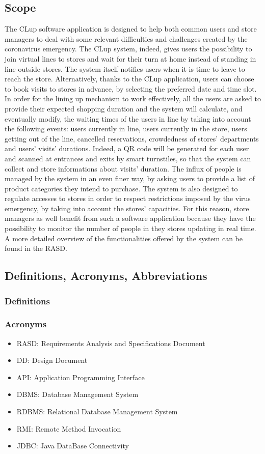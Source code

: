 \documentclass{article}
\begin{document}
\subsection{Scope}
The CLup software application is designed to help both common users and store managers to deal with some relevant difficulties and challenges created by the coronavirus emergency. The CLup system, indeed, gives users the possibility to join virtual lines to stores and wait for their turn at home instead of standing in line outside stores. The system itself notifies users when it is time to leave to reach the store. Alternatively, thanks to the CLup application, users can choose to book visits to stores in advance, by selecting the preferred date and time slot.
 In order for the lining up mechanism to work effectively, all the users are asked to provide their expected shopping duration and the system will calculate, and eventually modify, the waiting times of the users in line by taking into account the following events: users currently in line, users currently in the store, users getting out of the line, cancelled reservations, crowdedness of stores’ departments and users’ visits’ durations. Indeed, a QR code will be generated for each user and scanned at entrances and exits by smart turnstiles, so that the system can collect and store informations about visits’ duration. The influx of people is managed by the system in an even finer way, by asking users to provide a list of product categories they intend to purchase. The system is also designed to regulate accesses to stores in order to respect restrictions imposed by the virus emergency, by taking into account the stores’ capacities. For this reason, store managers as well benefit from such a software application because they have the possibility to monitor the number of people in they stores updating in real time.\\
A more detailed overview of the functionalities offered by the system can be found in the RASD.

\subsection{Definitions, Acronyms, Abbreviations}
\subsubsection{Definitions}
\subsubsection{Acronyms}
\begin{itemize}
\item RASD: Requirements Analysis and Specifications Document
\item DD: Design Document
\item API: Application Programming Interface
\item DBMS: Database Management System
\item RDBMS: Relational Database Management System
\item RMI: Remote Method Invocation
\item JDBC: Java DataBase Connectivity
\end{itemize}
\end{document}

